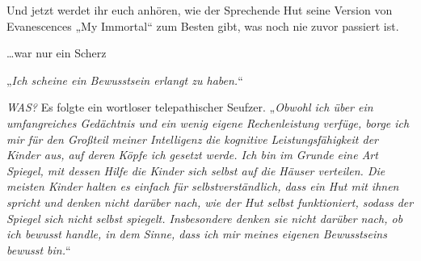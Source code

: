 
\begin{chapterOpeningAuthorNote}
%
Und jetzt werdet ihr euch anhören, wie der Sprechende Hut seine Version von Evanescences „My Immortal“ zum Besten gibt, was noch nie zuvor passiert ist.

…war nur ein Scherz
\end{chapterOpeningAuthorNote}


\hplettrineextrapara
„\emph{Ich scheine ein Bewusstsein erlangt zu haben.}“

\emph{WAS?}
Es folgte ein wortloser telepathischer Seufzer. „\emph{Obwohl ich über ein umfangreiches Gedächtnis und ein wenig eigene Rechenleistung verfüge, borge ich mir für den Großteil meiner Intelligenz die kognitive Leistungsfähigkeit der Kinder aus, auf deren Köpfe ich gesetzt werde. Ich bin im Grunde eine Art Spiegel, mit dessen Hilfe die Kinder \emph{sich selbst} auf die Häuser verteilen. Die meisten Kinder halten es einfach für selbstverständlich, dass ein Hut mit ihnen spricht und denken nicht darüber nach, wie der Hut \emph{selbst} funktioniert, sodass der Spiegel sich nicht selbst spiegelt. \emph{Insbesondere} denken sie nicht darüber nach, ob ich bewusst handle, in dem Sinne, dass ich mir meines eigenen Bewusstseins bewusst bin.}“

